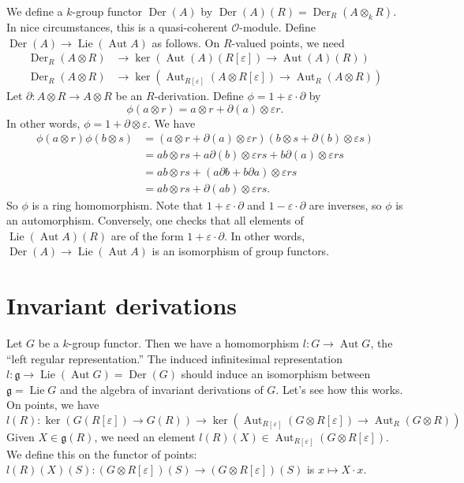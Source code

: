 \documentclass{article}
\DeclareMathOperator{\automorphism}{Aut}
\DeclareMathOperator{\derivation}{Der}
\DeclareMathOperator{\lie}{Lie}
\newcommand{\fg}{\mathfrak{g}}
\newcommand{\sO}{\mathscr{O}}
\begin{document}
We define a $k$-group functor $\derivation(A)$ by 
$\derivation(A)(R) = \derivation_R(A\otimes_k R)$. In nice circumstances, this 
is a quasi-coherent $\sO$-module. Define 
$\derivation(A) \to \lie(\automorphism A)$ as follows. On $R$-valued points, 
we need 
\begin{align*}
  \derivation_R(A\otimes R) &\to \ker(\automorphism(A)(R[\varepsilon]) \to \automorphism(A)(R)) \\
  \derivation_R(A\otimes R) &\to \ker(\automorphism_{R[\varepsilon]}(A\otimes R[\varepsilon]) \to \automorphism_R(A\otimes R))
\end{align*}
Let $\partial:A\otimes R\to A\otimes R$ be an $R$-derivation. Define 
$\phi=1+\varepsilon\cdot \partial$ by 
\[
  \phi(a\otimes r) = a\otimes r + \partial(a)\otimes \varepsilon r .
\]
In other words, $\phi=1+\partial\otimes \varepsilon$. We have 
\begin{align*}
  \phi(a\otimes r)\phi(b\otimes s) 
    &= (a\otimes r + \partial(a)\otimes \varepsilon r)(b\otimes s+\partial(b)\otimes \varepsilon s) \\
    &= a b\otimes r s + a \partial(b)\otimes \varepsilon r s + b\partial(a)\otimes \varepsilon r s \\
    &= a b\otimes r s + (a\partial b + b\partial a)\otimes \varepsilon r s \\
    &= a b\otimes r s + \partial(a b)\otimes \varepsilon r s .
\end{align*}
So $\phi$ is a ring homomorphism. Note that $1+\varepsilon\cdot \partial$ and 
$1-\varepsilon\cdot \partial$ are inverses, so $\phi$ is an automorphism. Conversely, 
one checks that all elements of $\lie(\automorphism A)(R)$ are of the form 
$1+\varepsilon\cdot \partial$. In other words, 
$\derivation(A) \to \lie(\automorphism A)$ is an isomorphism of group functors. 





\section{Invariant derivations}

Let $G$ be a $k$-group functor. Then we have a homomorphism 
$l:G\to \automorphism G$, the ``left regular representation.'' The induced 
infinitesimal representation $l:\fg \to \lie(\automorphism G)=\derivation(G)$ 
should induce an isomorphism between $\fg=\lie G$ and the algebra of 
invariant derivations of $G$. Let's see how this works. On points, we have 
\[
  l(R):\ker(G(R[\varepsilon]) \to G(R)) \to \ker(\automorphism_{R[\varepsilon]}(G\otimes R[\varepsilon]) \to \automorphism_R(G\otimes R)) 
\]
Given $X\in \fg(R)$, we need an element 
$l(R)(X)\in \automorphism_{R[\varepsilon]}(G\otimes R[\varepsilon])$. We define 
this on the functor of points: 
$l(R)(X)(S):(G\otimes R[\varepsilon])(S) \to (G\otimes R[\varepsilon])(S)$ 
is $x\mapsto X\cdot x$. 
\end{document}
